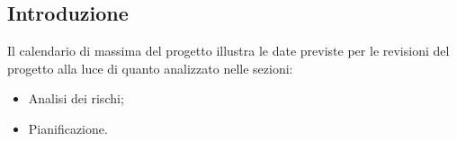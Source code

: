 \subsection{Introduzione}
Il calendario di massima del progetto illustra le date previste per le revisioni del progetto
alla luce di quanto analizzato nelle sezioni: 
\begin{itemize}
    \item Analisi dei rischi;
    \item Pianificazione.
\end{itemize}
